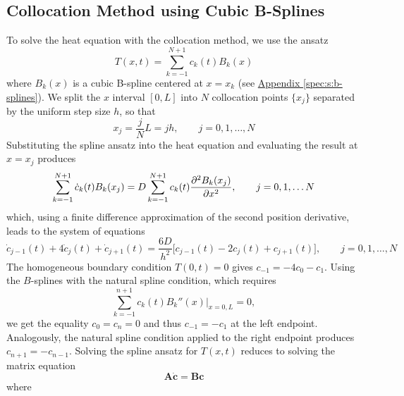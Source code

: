 \documentclass[11pt, a4paper]{article}
\newcommand{\mat}[1]{\mathbf{#1}}
\begin{document}
\subsection{Collocation Method using Cubic B-Splines} \label{spec:ss:collocation}
To solve the heat equation with the collocation method, we use the ansatz
\begin{equation*}
	T(x, t) = \sum_{k=-1}^{N+1}c_{k}(t)B_{k}(x)
\end{equation*}
where $ B_{k}(x) $ is a cubic B-spline centered at $ x = x_{k} $ (see \hyperref[spec:s:b-splines]{Appendix \ref{spec:s:b-splines}}). We split the $ x $ interval $ [0, L] $ into $ N $ collocation points $ \{x_{j}\} $ separated by the uniform step size $ h $, so that 
\begin{equation*}
	x_{j} = \frac{j}{N}L = jh, \qquad j = 0, 1, \ldots, N
\end{equation*}
Substituting the spline ansatz into the heat equation and evaluating the result at $ x = x_{j} $ produces
\begin{equation*}
	\sum_{k=-1}^{N+1} \dot{c}_{k}(t)B_{k}(x_{j}) = D \sum_{k=-1}^{N+1}c_{k}(t)\pdv[2]{B_{k}(x_{j})}{x}, \qquad j = 0, 1, \ldots N
\end{equation*}
which, using a finite difference approximation of the second position derivative, leads to the system of equations
\begin{equation*}
	\dot{c}_{j-1}(t) + 4\dot{c}_{j}(t) + \dot{c}_{j+1}(t) = \frac{6D}{h^{2}}\big[c_{j-1}(t) - 2c_{j}(t) + c_{j+1}(t)\big], \qquad j = 0, 1, \ldots, N
\end{equation*}
The homogeneous boundary condition $ T(0, t) = 0 $ gives $ c_{-1} = -4c_{0} - c_{1} $. Using the $ B $-splines with the natural spline condition, which requires
\begin{equation*}
	\sum_{k=-1}^{n+1}c_{k}(t)B_{k}''(x)\big |_{x = 0, L} = 0,
\end{equation*}
we get the equality $ c_{0} = c_{n} = 0 $ and thus $ c_{-1} = -c_{1} $ at the left endpoint. Analogously, the natural spline condition applied to the right endpoint produces $ c_{n+1} = -c_{n-1} $. Solving the spline ansatz for $ T(x, t) $ reduces to solving the matrix equation
\begin{equation*}
	\mat{A} \dot{\bm{c}} = \mat{B}\bm{c}
\end{equation*}
where
\end{document}
